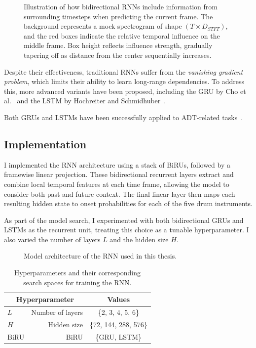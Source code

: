 \begin{figure}[H]
    \centering
    
    \caption{Illustration of how bidirectional \glspl{RNN} include information from surrounding timesteps when predicting the current frame. The background represents a mock spectrogram of shape $(T \times D_{STFT})$, and the red boxes indicate the relative temporal influence on the middle frame. Box height reflects influence strength, gradually tapering off as distance from the center sequentially increases.}
    \label{RNNInfluenceFigure}
\end{figure}

Despite their effectiveness, traditional \glspl{RNN} suffer from the \textit{vanishing gradient problem}, which limits their ability to learn long-range dependencies. To address this, more advanced variants have been proposed, including the \gls{GRU} by Cho et al.~\cite{DBLP:conf/emnlp/ChoMGBBSB14} and the \gls{LSTM} by Hochreiter and Schmidhuber~\cite{10.1162/neco.1997.9.8.1735}.

Both \glspl{GRU} and \glspl{LSTM} have been successfully applied to \gls{ADT}-related tasks~\cite{Southall2016AutomaticDT, vogl2016recurrent, Vogl2017DrumTV, signals4040042}.

\subsection{Implementation}

I implemented the \gls{RNN} architecture using a stack of \glspl{BiRU}, followed by a framewise linear projection. These bidirectional recurrent layers extract and combine local temporal features at each time frame, allowing the model to consider both past and future context. The final linear layer then maps each resulting hidden state to onset probabilities for each of the five drum instruments. 

As part of the model search, I experimented with both bidirectional \glspl{GRU} and \glspl{LSTM} as the recurrent unit, treating this choice as a tunable hyperparameter. I also varied the number of layers $L$ and the hidden size $H$.

\begin{figure}[H]
    \centering
    
    \caption{Model architecture of the \acrlong{RNN} used in this thesis.}
    \label{RNNFigure}
\end{figure}

\begin{table}[H]
    \centering
    \begin{tabular}{lr|c}
        \multicolumn{2}{c|}{Hyperparameter} & Values       \\
        \hline
        $L$ & Number of layers      & \{2, 3, 4, 5, 6\} \\
        $H$ & Hidden size      & \{72, 144, 288, 576\} \\
        \gls{BiRU} & \acrlong{BiRU} & \{\gls{GRU}, \gls{LSTM}\}\\
    \end{tabular}
    \caption{Hyperparameters and their corresponding search spaces for training the \acrlong{RNN}.}
    \label{RNNHyperparams}
\end{table}

